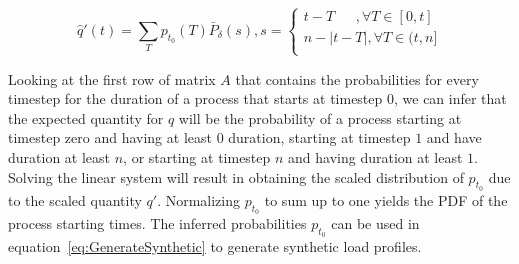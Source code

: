 \documentclass[conference]{IEEEtran}
\begin{document}
\begin{small}
\begin{equation}\label{eq:infer_t_0_axis}
\hat{q}'(t) = \sum_{T} p_{t_0}(T) \bar{P}_{\delta} (s), s =
\left\lbrace
\begin{array}{l}
 t-T~~~~~~~,\forall T \in [0, t]\\
 n-|t-T|,\forall T \in (t, n]\\
\end{array}
\right.
\end{equation}
\end{small}Looking at the first row of matrix $A$ that contains the probabilities for every timestep for the duration of a process that starts at timestep $0$, we can infer that the expected quantity for $q$ will be the probability of a process starting at timestep zero and having at least $0$ duration, starting at timestep $1$ and have duration at least $n$, or starting at timestep $n$ and having duration at least $1$. Solving the linear system will result in obtaining the scaled distribution of $p_{t_0}$ due to the scaled quantity $q'$. Normalizing $p_{t_0}$ to sum up to one yields the PDF of the process starting times. The inferred probabilities $p_{t_0}$ can be used in equation~\eqref{eq:GenerateSynthetic} to generate synthetic load profiles. 


%
%
%
 
\end{document}
